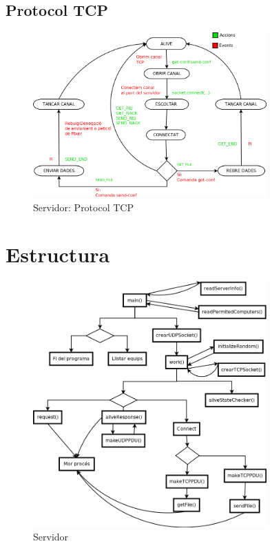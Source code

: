 \documentclass[11pt]{article}
\begin{document}
\subsection{Protocol TCP}
\begin{figure}[h]
    \centering
    \includegraphics[width=0.8\textwidth]{ServidorTCP.png}
    \caption{Servidor: Protocol TCP}
    \label{fig:PrtocolTCPserv}
\end{figure}
\newpage

\section{Estructura}
\begin{figure}[h]
    \centering
    \includegraphics[width=0.8\textwidth]{server.png}
    \caption{Servidor}
    \label{fig:server}
\end{figure}
\newpage
\end{document}
